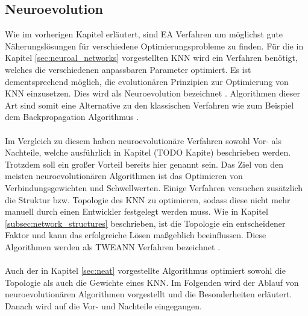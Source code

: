 \subsection{Neuroevolution}
Wie im vorherigen Kapitel erläutert, sind \ac{EA} Verfahren um möglichst gute Näherungslösungen für verschiedene Optimierungsprobleme zu finden. Für die in Kapitel \ref{sec:neuroal_networks} vorgestellten \ac{KNN} wird ein Verfahren benötigt, welches die verschiedenen anpassbaren Parameter optimiert. Es ist dementsprechend möglich, die evolutionären Prinzipien zur Optimierung von \ac{KNN} einzusetzen. Dies wird als Neuroevolution bezeichnet \cite{meisner2009neurostrategies}. Algorithmen dieser Art sind somit eine Alternative zu den klassischen Verfahren wie zum Beispiel dem Backpropagation Algorithmus \cite{whitley1993genetic}. 
\\\\
Im Vergleich zu diesem haben neuroevolutionäre Verfahren sowohl Vor- als Nachteile, welche ausführlich in Kapitel (TODO Kapite) beschrieben werden. Trotzdem soll ein großer Vorteil bereits hier genannt sein. Das Ziel von den meisten neuroevolutionären Algorithmen ist das Optimieren von Verbindungsgewichten und Schwellwerten. Einige Verfahren versuchen zusätzlich die Struktur bzw. Topologie des \ac{KNN} zu optimieren, sodass diese nicht mehr manuell durch einen Entwickler festgelegt werden muss. Wie in Kapitel \ref{subsec:network_structures} beschrieben, ist die Topologie ein entscheidener Faktor und kann das erfolgreiche Lösen maßgeblich beeinflussen. Diese Algorithmen werden als \ac{TWEANN} Verfahren bezeichnet \cite{stanley2002evolving} . 
\\\\
Auch der in Kapitel \ref{sec:neat} vorgestellte Algorithmus optimiert sowohl die Topologie als auch die Gewichte eines \ac{KNN}. Im Folgenden wird der Ablauf von neuroevolutionären Algorithmen vorgestellt und die Besonderheiten erläutert. Danach wird auf die Vor- und Nachteile eingegangen.

